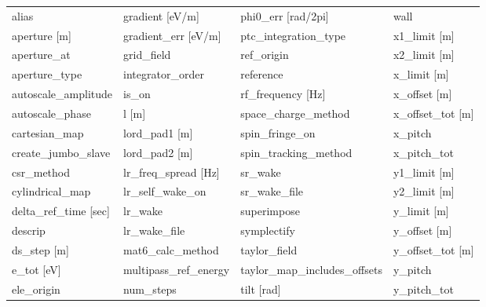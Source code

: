  \begin{tabular}{llll} \toprule
alias                          & gradient [eV/m]                & phi0_err [rad/2pi]             & wall                           \\
aperture [m]                   & gradient_err [eV/m]            & ptc_integration_type           & x1_limit [m]                   \\
aperture_at                    & grid_field                     & ref_origin                     & x2_limit [m]                   \\
aperture_type                  & integrator_order               & reference                      & x_limit [m]                    \\
autoscale_amplitude            & is_on                          & rf_frequency [Hz]              & x_offset [m]                   \\
autoscale_phase                & l [m]                          & space_charge_method            & x_offset_tot [m]               \\
cartesian_map                  & lord_pad1 [m]                  & spin_fringe_on                 & x_pitch                        \\
create_jumbo_slave             & lord_pad2 [m]                  & spin_tracking_method           & x_pitch_tot                    \\
csr_method                     & lr_freq_spread [Hz]            & sr_wake                        & y1_limit [m]                   \\
cylindrical_map                & lr_self_wake_on                & sr_wake_file                   & y2_limit [m]                   \\
delta_ref_time [sec]           & lr_wake                        & superimpose                    & y_limit [m]                    \\
descrip                        & lr_wake_file                   & symplectify                    & y_offset [m]                   \\
ds_step [m]                    & mat6_calc_method               & taylor_field                   & y_offset_tot [m]               \\
e_tot [eV]                     & multipass_ref_energy           & taylor_map_includes_offsets    & y_pitch                        \\
ele_origin                     & num_steps                      & tilt [rad]                     & y_pitch_tot                    \\

\end{tabular}
